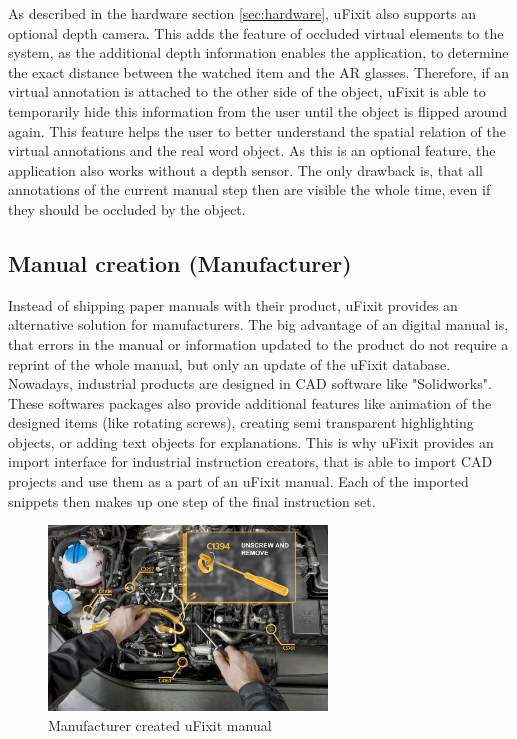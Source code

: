 As described in the hardware section \ref{sec:hardware}, uFixit also supports an optional depth camera. This adds the feature of occluded virtual elements to the system, as the additional depth information enables the application, to determine the exact distance between the watched item and the AR glasses. Therefore, if an virtual annotation is attached to the other side of the object, uFixit is able to temporarily hide this information from the user until the object is flipped around again. This feature helps the user to better understand the spatial relation of the virtual annotations and the real word object.
As this is an optional feature, the application also works without a depth sensor. The only drawback is, that all annotations of the current manual step then are visible the whole time, even if they should be occluded by the object.


\subsection{Manual creation (Manufacturer)}
Instead of shipping paper manuals with their product, uFixit provides an alternative solution for manufacturers. The big advantage of an digital manual is, that errors in the manual or information updated to the product do not require a reprint of the whole manual, but only an update of the uFixit database. Nowadays, industrial products are designed in CAD software like "Solidworks". These softwares packages also provide additional features like animation of the designed items (like rotating screws), creating semi transparent highlighting objects, or adding text objects for explanations. This is why uFixit provides an import interface for industrial instruction creators, that is able to import CAD projects and use them as a part of an uFixit manual. Each of the imported snippets then makes up one step of the final instruction set.

\begin{figure}[H]
		\includegraphics[width=0.66\textwidth]{../images/manufacturer.jpg}
		\centering
		\caption{Manufacturer created uFixit manual}
		\label{fig:cardBoard}
\end{figure}


